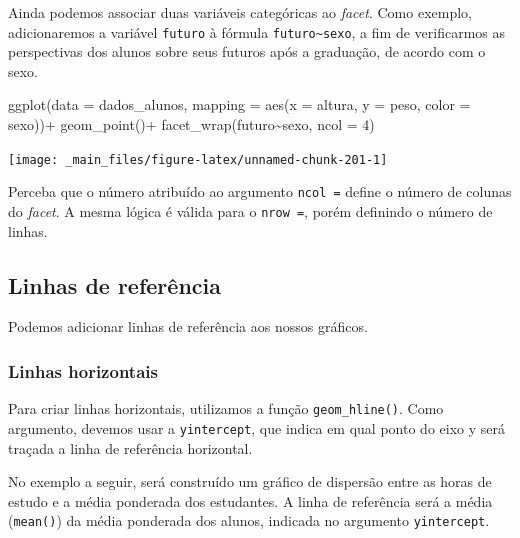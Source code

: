 \documentclass[
  brazilian,
]{book}
\newenvironment{Shaded}{\begin{snugshade}}{\end{snugshade}}
\newcommand{\AttributeTok}[1]{\textcolor[rgb]{0.77,0.63,0.00}{#1}}
\newcommand{\DecValTok}[1]{\textcolor[rgb]{0.00,0.00,0.81}{#1}}
\newcommand{\FunctionTok}[1]{\textcolor[rgb]{0.00,0.00,0.00}{#1}}
\newcommand{\NormalTok}[1]{#1}
\newcommand{\SpecialCharTok}[1]{\textcolor[rgb]{0.00,0.00,0.00}{#1}}
\begin{document}
Ainda podemos associar duas variáveis categóricas ao \emph{facet}. Como exemplo, adicionaremos a variável \texttt{futuro} à fórmula \texttt{futuro\textasciitilde{}sexo}, a fim de verificarmos as perspectivas dos alunos sobre seus futuros após a graduação, de acordo com o sexo.

\begin{Shaded}
\begin{Highlighting}[]
\FunctionTok{ggplot}\NormalTok{(}\AttributeTok{data =}\NormalTok{ dados\_alunos,}
       \AttributeTok{mapping =} \FunctionTok{aes}\NormalTok{(}\AttributeTok{x =}\NormalTok{ altura,}
                     \AttributeTok{y =}\NormalTok{ peso,}
                     \AttributeTok{color =}\NormalTok{ sexo))}\SpecialCharTok{+}
  \FunctionTok{geom\_point}\NormalTok{()}\SpecialCharTok{+}
  \FunctionTok{facet\_wrap}\NormalTok{(futuro}\SpecialCharTok{\textasciitilde{}}\NormalTok{sexo, }\AttributeTok{ncol =} \DecValTok{4}\NormalTok{)}
\end{Highlighting}
\end{Shaded}

\begin{center}\texttt{[image: \_main\_files/figure-latex/unnamed-chunk-201-1]} \end{center}

Perceba que o número atribuído ao argumento \texttt{ncol\ =} define o número de colunas do \emph{facet}. A mesma lógica é válida para o \texttt{nrow\ =}, porém definindo o número de linhas.

\hypertarget{linhas-de-referuxeancia}{%
\subsection{Linhas de referência}\label{linhas-de-referuxeancia}}

Podemos adicionar linhas de referência aos nossos gráficos.

\hypertarget{linhas-horizontais}{%
\subsubsection*{Linhas horizontais}\label{linhas-horizontais}}

Para criar linhas horizontais, utilizamos a função \texttt{geom\_hline()}. Como argumento, devemos usar a \texttt{yintercept}, que indica em qual ponto do eixo y será traçada a linha de referência horizontal.

No exemplo a seguir, será construído um gráfico de dispersão entre as horas de estudo e a média ponderada dos estudantes. A linha de referência será a média (\texttt{mean()}) da média ponderada dos alunos, indicada no argumento \texttt{yintercept}.
\end{document}
